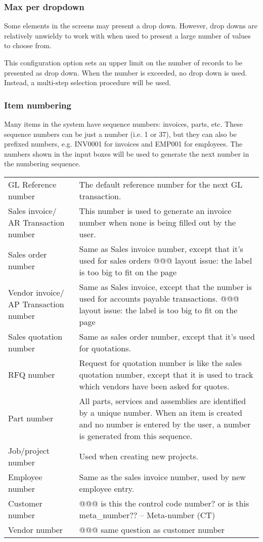\subsubsection{Max per dropdown}
\label{subsubsec-company-config-defaults-max-dropdown}

Some elements in the screens may present a drop down. However, drop downs are
relatively unwieldy to work with when used to present a large number of values
to choose from.

This configuration option sets an upper limit on the number of records to be
presented as drop down.  When the number is exceeded, no drop down is used.  Instead,
a multi-step selection procedure will be used.

\subsubsection{Item numbering}
\label{subsubsec-company-config-defaults-item-numbers}

Many items in the system have sequence numbers: invoices, parts, etc.
 These sequence numbers can be just a number (i.e. 1 or 37),
but they can also be prefixed numbers, e.g. INV0001 for invoices and EMP001 for employees.
The numbers shown in the input boxes will be used to generate the next number in the
numbering sequence.

\begin{longtable}{ p{3.4cm} p{6.7cm} }
GL Reference number & The default reference number for the next GL
transaction. \\
Sales invoice/ AR Transaction number & This number is used to generate an invoice
number when none is being filled out by the user. \\
Sales order number & Same as Sales invoice number, except that it's used for sales orders @@@ layout issue: the label is too big to fit on the page \\
Vendor invoice/ AP Transaction number & Same as Sales invoice, except that the number
is used for accounts payable transactions. @@@ layout issue: the label is too big to fit on the page \\
Sales quotation number & Same as sales order number, except that it's used for quotations. \\
RFQ number & Request for quotation number is like the sales quotation number, except
that it is used to track which vendors have been asked for quotes. \\
Part number & All parts, services and assemblies are identified by a unique number.
When an item is created and no number is entered by the user, a number is generated
from this sequence. \\
Job/project number & Used when creating new projects. \\
Employee number & Same as the sales invoice number, used by new employee entry. \\
Customer number & @@@ is this the control code number? or is this
meta\_number?? -- Meta-number (CT) \\
Vendor number & @@@ same question as customer number \\
\end{longtable}

